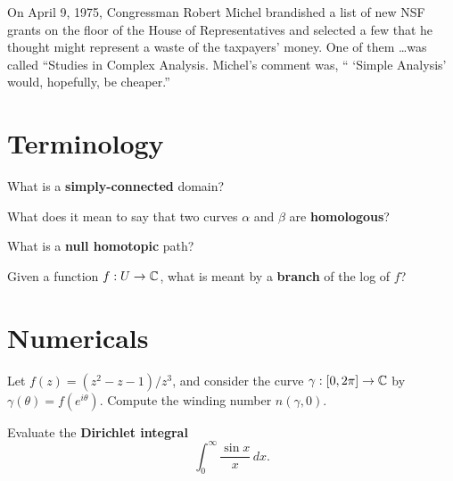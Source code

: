 \documentclass{homework}
\author{Jim Fowler}
\begin{document}
\maketitle

\begin{inspiration}
  On April 9, 1975, Congressman Robert Michel brandished a list of new
  NSF grants on the floor of the House of Representatives and selected
  a few that he thought might represent a waste of the taxpayers'
  money. One of them \ldots was called ``Studies in Complex
  Analysis. Michel's comment was, `` `Simple Analysis' would,
  hopefully, be cheaper.''
\end{inspiration}

\section{Terminology}

\begin{problem}
  What is a \textbf{simply-connected} domain?
\end{problem}

\begin{problem}
  What does it mean to say that two curves $\alpha$ and $\beta$ are
  \textbf{homologous}?
\end{problem}

\begin{problem}
  What is a \textbf{null homotopic} path?
\end{problem}

\begin{problem}
  Given a function $f : U \to \mathbb{C}$, what is meant by a \textbf{branch} of the log of $f$?
\end{problem}

\section{Numericals}

\begin{problem}
  Let $f(z) = (z^2-z-1)/z^3$, and consider the curve
  $\gamma : [0,2\pi] \to \mathbb{C}$ by $\gamma(\theta) = f(e^{i\theta})$.
  Compute the winding number $n(\gamma,0)$.
\end{problem}

\begin{problem}
  Evaluate the \textbf{Dirichlet integral}
  \[
    \int_0^\infty \frac{\sin x}{x} \, dx.
  \]
\end{problem}
\end{document}
